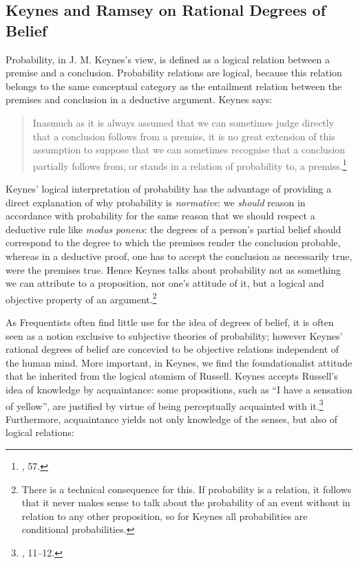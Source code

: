 \hypertarget{rational-degrees-of-belief}{%
\subsection{Keynes and Ramsey on Rational Degrees of
Belief}\label{sec:rational-degrees-of-belief}}

Probability, in J. M. Keynes's view, is defined as a logical relation between
a premise and a conclusion. Probability relations are logical, because
this relation belongs to the same conceptual category as the entailment
relation between the premises and conclusion in a deductive argument.
Keynes says:

\begin{quote}
Inasmuch as it is always assumed that we can sometimes judge directly
that a conclusion follows from a premiss, it is no great extension of
this assumption to suppose that we can sometimes recognise that a
conclusion partially follows from, or stands in a relation of
probability to, a premiss.\footnote{\cite{keynes}, 57.}
\end{quote}

Keynes' logical interpretation of probability has the advantage of
providing a direct explanation of why probability is \emph{normative}:
we \emph{should} reason in accordance with probability for the same reason
that we should respect a deductive rule like \emph{modus ponens}: the
degrees of a person's partial belief should correspond to the degree to
which the premises render the conclusion probable, whereas in a
deductive proof, one has to accept the conclusion as necessarily true,
were the premises true. Hence Keynes talks about probability not as
something we can attribute to a proposition, nor one's attitude of it,
but a logical and objective property of an argument.\footnote{There is a technical
  consequence for this. If probability is a relation, it follows that it
  never makes sense to talk about the probability of an event without in
  relation to any other proposition, so for Keynes all probabilities are
  conditional probabilities.}

As Frequentists often find little use for the idea of degrees of belief,
it is often seen as a notion exclusive to subjective theories of
probability; however Keynes' rational degrees of belief are concevied to
be objective relations independent of the human mind. More important, in Keynes, we find the foundationalist attitude that he
inherited from the logical atomism of Russell. Keynes accepts Russell's
idea of knowledge by acquaintance: some propositions, such as ``I have a
sensation of yellow'', are justified by virtue of being perceptually
acquainted with it.\footnote{\cite{keynes}, 11--12.} Furthermore, acquaintance
yields not only knowledge of the senses, but also of logical relations:

